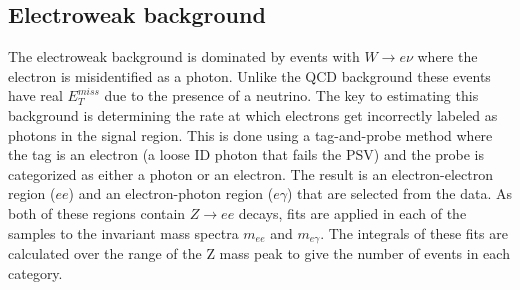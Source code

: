 \subsection{Electroweak background}
The electroweak background is dominated by events with $W \rightarrow e \nu$ where the electron is misidentified as a photon.  Unlike the QCD background these events have  real $E^{miss}_T$ due to the presence of a neutrino.  The key to estimating this background is determining the rate at which electrons get incorrectly labeled as photons in the signal region.  This is done using a tag-and-probe method where the tag is an electron (a loose ID photon that fails the PSV) and the probe is categorized as either a photon or an electron.  The result is an electron-electron region ($ee$) and an electron-photon region ($e\gamma$) that are selected from the data.    As both of these regions contain $Z\rightarrow ee$ decays, fits are applied in each of the samples to the invariant mass spectra $m_{ee}$ and $m_{e\gamma}$.  The integrals of these fits are calculated over the range of the Z mass peak to give the number of events in each category.  





